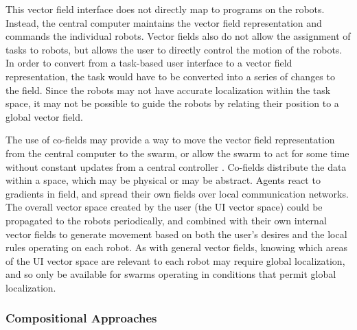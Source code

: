 This vector field interface does not directly map to programs on the robots. 
Instead, the central computer maintains the vector field representation and commands the individual robots.
Vector fields also do not allow the assignment of tasks to robots, but allows the user to directly control the motion of the robots. 
In order to convert from a task-based user interface to a vector field representation, the task would have to be converted into a series of changes to the field.
Since the robots may not have accurate localization within the task space, it may not be possible to guide the robots by relating their position to a global vector field. 

The use of co-fields may provide a way to move the vector field representation from the central computer to the swarm, or allow the swarm to act for some time without constant updates from a central controller \cite{mamei2003co}.
Co-fields distribute the data within a space, which may be physical or may be abstract. 
Agents react to gradients in field, and spread their own fields over local communication networks. 
The overall vector space created by the user (the UI vector space) could be propagated to the robots periodically, and combined with their own internal vector fields to generate movement based on both the user's desires and the local rules operating on each robot. 
As with general vector fields, knowing which areas of the UI vector space are relevant to each robot may require global localization, and so only be available for swarms operating in conditions that permit global localization. 

\subsubsection{Compositional Approaches}

